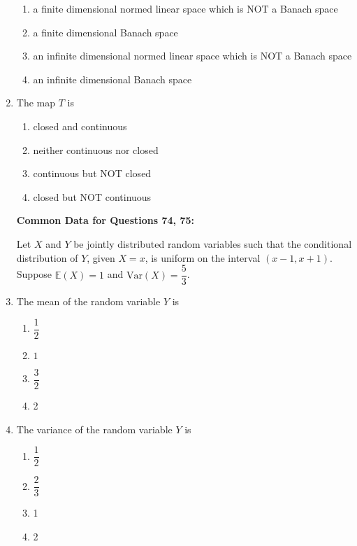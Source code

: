\documentclass[journal]{IEEEtran}
\numberwithin{equation}{enumi}
\numberwithin{figure}{enumi}
\begin{document}
\begin{enumerate}
\begin{enumerate}
   
    \item a finite dimensional normed linear space which is NOT a Banach space
    \item a finite dimensional Banach space
    \item an infinite dimensional normed linear space which is NOT a Banach space
    \item an infinite dimensional Banach space
\end{enumerate}



\item The map $T$ is
\hfill{}
\begin{multicols}{2}
    \begin{enumerate}
        \item closed and continuous
        \item neither continuous nor closed
        \item continuous but NOT closed
        \item closed but NOT continuous
    \end{enumerate}
    \end{multicols}

\bigskip

\textbf{Common Data for Questions 74, 75:}

Let $X$ and $Y$ be jointly distributed random variables such that the conditional distribution of $Y$, given $X = x$, is uniform on the interval $(x - 1, x + 1)$. Suppose $\mathbb{E}(X) = 1$ and $\text{Var}(X) = \dfrac{5}{3}$.



\item The mean of the random variable $Y$ is
\hfill{}
\begin{multicols}{4}
    \begin{enumerate}
        \item  $\dfrac{1}{2}$
        \item $1$
        \item $\dfrac{3}{2}$
        \item 2
    \end{enumerate}
    \end{multicols}


\item The variance of the random variable $Y$ is
\hfill{}
\begin{multicols}{4}
    \begin{enumerate}
        \item $\dfrac{1}{2}$
        \item $\dfrac{2}{3}$
        \item 1
        \item 2
    \end{enumerate}
    \end{multicols}



\end{enumerate}
\end{document}
